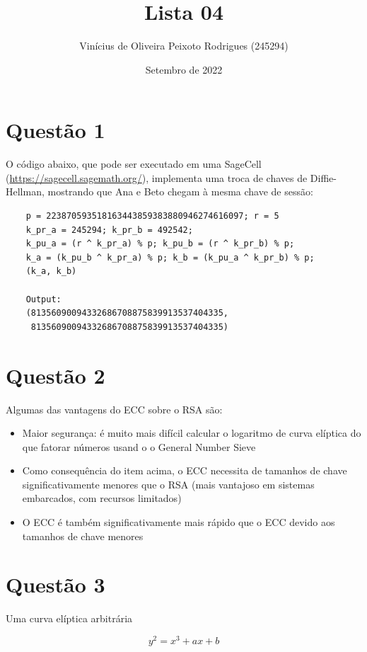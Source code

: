 \documentclass{article}
\title{Lista 04}
\author{Vinícius de Oliveira Peixoto Rodrigues (245294)}
\date{Setembro de 2022}
\begin{document}
\maketitle

\section*{Questão 1}

O código abaixo, que pode ser executado em uma SageCell (\url{https://sagecell.sagemath.org/}), implementa uma troca de chaves de Diffie-Hellman, mostrando que Ana e Beto chegam à mesma chave de sessão:

\begin{verbatim}
    p = 223870593518163443859383880946274616097; r = 5
    k_pr_a = 245294; k_pr_b = 492542;
    k_pu_a = (r ^ k_pr_a) % p; k_pu_b = (r ^ k_pr_b) % p;
    k_a = (k_pu_b ^ k_pr_a) % p; k_b = (k_pu_a ^ k_pr_b) % p;
    (k_a, k_b)

    Output:
    (81356090094332686708875839913537404335,
     81356090094332686708875839913537404335)
\end{verbatim}

\section*{Questão 2}

Algumas das vantagens do ECC sobre o RSA são:

\begin{itemize}
    \item Maior segurança: é muito mais difícil calcular o logaritmo de curva elíptica do que fatorar números usand o o General Number Sieve
    \item Como consequência do item acima, o ECC necessita de tamanhos de chave significativamente menores que o RSA (mais vantajoso em sistemas embarcados, com recursos limitados)
    \item O ECC é também significativamente mais rápido que o ECC devido aos tamanhos de chave menores
\end{itemize}

\section*{Questão 3}

Uma curva elíptica arbitrária

\begin{equation*}
    y^2 = x^3 + ax + b
\end{equation*}
\end{document}
